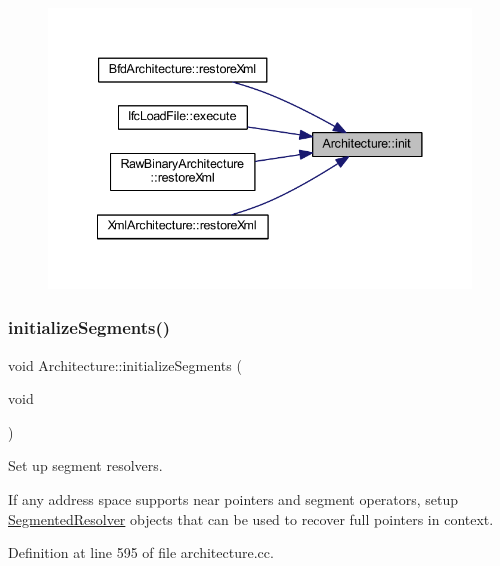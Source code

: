 \begin{figure}[H]
\begin{center}
\leavevmode
\includegraphics[width=341pt]{class_architecture_abcf0d020ebe4248b9b35f3a51b78363b_icgraph}
\end{center}
\end{figure}
\mbox{\label{class_architecture_a20fb7a8902a213abbf0c730fa5b6a9d7}} 
\subsubsection{\texorpdfstring{initializeSegments()}{initializeSegments()}}
{\footnotesize\ttfamily void Architecture\+::initialize\+Segments (\begin{DoxyParamCaption}\item[{void}]{ }\end{DoxyParamCaption})\hspace{0.3cm}{\ttfamily [protected]}}



Set up segment resolvers. 

If any address space supports near pointers and segment operators, setup \mbox{\hyperlink{class_segmented_resolver}{Segmented\+Resolver}} objects that can be used to recover full pointers in context. 

Definition at line 595 of file architecture.\+cc.

